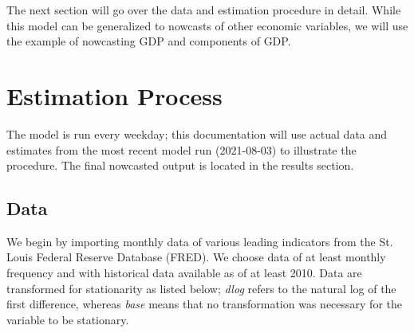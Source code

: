 \documentclass[11pt, letterpaper]{article}\usepackage[]{graphicx}\usepackage[]{color}
\begin{document}
The next section will go over the data and estimation procedure in detail. While this model can be generalized to nowcasts of other economic variables, we will use the example of nowcasting GDP and components of GDP.

\newpage
\section{Estimation Process}
The model is run every weekday; this documentation will use actual data and estimates from the most recent model run (2021-08-03) to illustrate the procedure. The final nowcasted output is located in the results section.

\subsection{Data}
We begin by importing monthly data of various leading indicators from the St. Louis Federal Reserve Database (FRED). We choose data of at least monthly frequency and with historical data available as of at least 2010. Data are transformed for stationarity as listed below; \textit{dlog} refers to the natural log of the first difference, whereas \textit{base} means that no transformation was necessary for the variable to be stationary.
\end{document}
